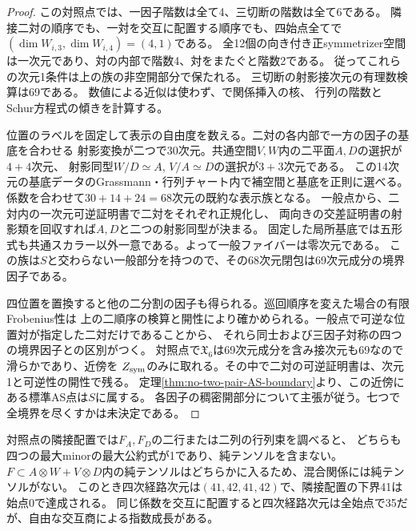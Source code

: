 \begin{proof}
この対照点では、一因子階数は全て4、三切断の階数は全て6である。
隣接二対の順序でも、一対を交互に配置する順序でも、四始点全てで
$(\dim W_{i,3},\dim W_{i,4})=(4,1)$である。
全12個の向き付き正symmetrizer空間は一次元であり、対の内部で階数4、対をまたぐと階数2である。
従ってこれらの次元1条件は上の族の非空開部分で保たれる。
三切断の射影接次元の有理数検算は69である。
数値による近似は使わず、で関係挿入の核、
行列の階数とSchur方程式の傾きを計算する。

位置のラベルを固定して表示の自由度を数える。二対の各内部で一方の因子の基底を合わせる
射影変換が二つで30次元。共通空間$V,W$内の二平面$A,D$の選択が$4+4$次元、
射影同型$W/D\simeq A$, $V/A\simeq D$の選択が$3+3$次元である。
この14次元の基底データのGrassmann・行列チャート内で補空間と基底を正則に選べる。
係数を合わせて$30+14+24=68$次元の既約な表示族となる。
一般点から、二対内の一次元可逆証明書で二対をそれぞれ正規化し、
両向きの交差証明書の射影類を回収すれば$A,D$と二つの射影同型が決まる。
固定した局所基底では五形式も共通スカラー以外一意である。よって一般ファイバーは零次元である。
この族は$S$と交わらない一般部分を持つので、その68次元閉包は69次元成分の境界因子である。

四位置を置換すると他の二分割の因子も得られる。巡回順序を変えた場合の有限Frobenius性は
上の二順序の検算と開性により確かめられる。一般点で可逆な位置対が指定した二対だけであることから、
それら同士および三因子対称の四つの境界因子との区別がつく。
対照点で$\mathfrak X_6$は69次元成分を含み接次元も69なので滑らかであり、近傍を
$Z_{\rm sym}$のみに取れる。その中で二対の可逆証明書は、次元1と可逆性の開性で残る。
定理\ref{thm:no-two-pair-AS-boundary}より、この近傍にある標準AS点は$S$に属する。
各因子の稠密開部分について主張が従う。七つで全境界を尽くすかは未決定である。
\end{proof}

対照点の隣接配置では$F_A,F_D$の二行または二列の行列束を調べると、
どちらも四つの最大minorの最大公約式が1であり、純テンソルを含まない。
$F\subset A\otimes W+V\otimes D$内の純テンソルはどちらかに入るため、混合関係には純テンソルがない。
このとき四次経路次元は$(41,42,41,42)$で、隣接配置の下界41は始点0で達成される。
同じ係数を交互に配置すると四次経路次元は全始点で35だが、自由な交互商による指数成長がある。


